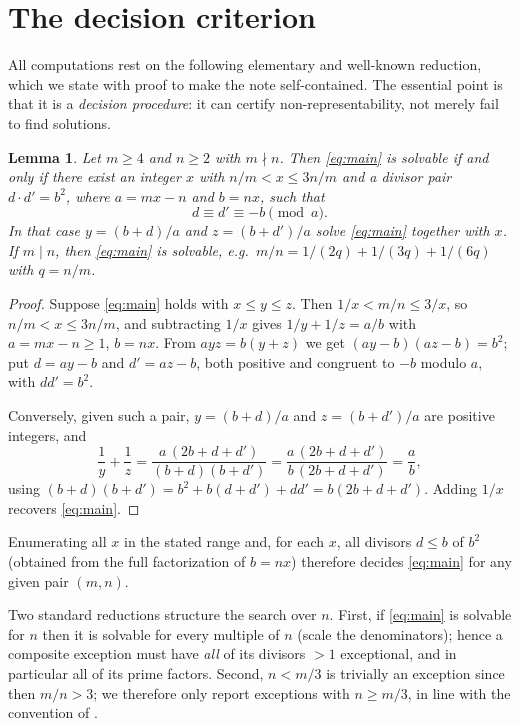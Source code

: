 \documentclass[11pt]{amsart}
\newtheorem{lemma}[theorem]{Lemma}
\theoremstyle{remark}
\theoremstyle{definition}
\begin{document}
\section{The decision criterion}\label{sec:criterion}

All computations rest on the following elementary and well-known
reduction, which we state with proof to make the note self-contained.
The essential point is that it is a \emph{decision procedure}: it can
certify non-representability, not merely fail to find solutions.

\begin{lemma}\label{lem:criterion}
Let $m \ge 4$ and $n \ge 2$ with $m \nmid n$. Then \eqref{eq:main} is
solvable if and only if there exist an integer $x$ with
$n/m < x \le 3n/m$ and a divisor pair $d \cdot d' = b^2$, where
$a = mx - n$ and $b = nx$, such that
\[
d \equiv d' \equiv -b \pmod{a}.
\]
In that case $y = (b+d)/a$ and $z = (b+d')/a$ solve \eqref{eq:main}
together with $x$. If $m \mid n$, then \eqref{eq:main} is solvable, e.g.\
$m/n = 1/(2q) + 1/(3q) + 1/(6q)$ with $q = n/m$.
\end{lemma}

\begin{proof}
Suppose \eqref{eq:main} holds with $x \le y \le z$. Then
$1/x < m/n \le 3/x$, so $n/m < x \le 3n/m$, and subtracting $1/x$ gives
$1/y + 1/z = a/b$ with $a = mx - n \ge 1$, $b = nx$. From
$ayz = b(y+z)$ we get $(ay - b)(az - b) = b^2$; put $d = ay - b$ and
$d' = az - b$, both positive and congruent to $-b$ modulo $a$, with
$dd' = b^2$.

Conversely, given such a pair, $y = (b+d)/a$ and $z = (b+d')/a$ are
positive integers, and
\[
\frac{1}{y} + \frac{1}{z}
= \frac{a\,(2b + d + d')}{(b+d)(b+d')}
= \frac{a\,(2b + d + d')}{b\,(2b + d + d')}
= \frac{a}{b},
\]
using $(b+d)(b+d') = b^2 + b(d+d') + dd' = b(2b + d + d')$. Adding $1/x$
recovers \eqref{eq:main}.
\end{proof}

Enumerating all $x$ in the stated range and, for each $x$, all divisors
$d \le b$ of $b^2$ (obtained from the full factorization of $b = nx$)
therefore decides \eqref{eq:main} for any given pair $(m, n)$.

Two standard reductions structure the search over $n$. First, if
\eqref{eq:main} is solvable for $n$ then it is solvable for every
multiple of $n$ (scale the denominators); hence a composite exception
must have \emph{all} of its divisors $> 1$ exceptional, and in particular
all of its prime factors. Second, $n < m/3$ is trivially an exception
since then $m/n > 3$; we therefore only report exceptions with
$n \ge m/3$, in line with the convention of \cite{pomeranceweingartner2026}.
\end{document}
